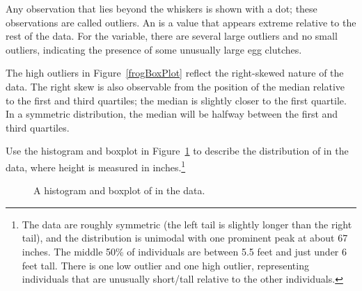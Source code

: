 Any observation that lies beyond the whiskers is shown with a dot; these observations are called outliers. An  is a value that appears extreme relative to the rest of the data. For the  variable, there are several large outliers and no small outliers, indicating the presence of some unusually large egg clutches.

The high outliers in Figure~\ref{frogBoxPlot} reflect the right-skewed nature of the data. The right skew is also observable from the position of the median relative to the first and third quartiles; the median is slightly closer to the first quartile. In a symmetric distribution, the median will be halfway between the first and third quartiles.

\begin{exercise}
	Use the histogram and boxplot in Figure~\ref{famussHistandBox} to describe the distribution of  in the  data, where height is measured in inches.\footnote{The data are roughly symmetric (the left tail is slightly longer than the right tail), and the distribution is unimodal with one prominent peak at about 67 inches. The middle 50\% of individuals are between 5.5 feet and just under 6 feet tall. There is one low outlier and one high outlier, representing individuals that are unusually short/tall relative to the other individuals.}
	
	\begin{figure}[h!]
		\centering
		\caption{A histogram and boxplot of  in the  data.}
		\label{famussHistandBox}
	\end{figure}	
	
\end{exercise}

